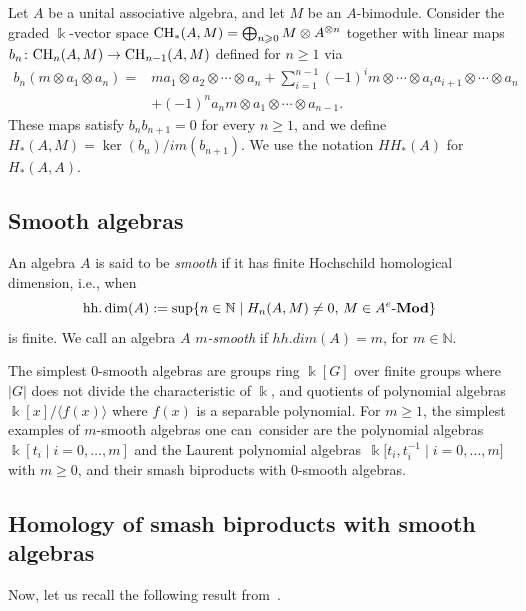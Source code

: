 \documentclass[10pt,a4paper]{amsart}
\newcommand{\B}[1]{\mathbb{#1}}
\newcommand{\lmod}[1]{{#1}\text{-{\bf Mod}}}
\newcommand{\CH}{{\rm CH}}
\renewcommand{\geq}{\geqslant}
\numberwithin{equation}{section}
\begin{document}
Let $A$ be a unital associative algebra, and let $M$ be an $A$-bimodule. Consider the
graded $\Bbbk$-vector space
$\CH_*(A,M) = \bigoplus_{n\geq 0} M\otimes A^{\otimes n} $ together with linear maps
$b_n\colon \CH_n(A,M)\to\CH_{n-1}(A,M)$ defined for $n\geq 1$ via
\begin{align*}
 b_n(m\otimes a_1\otimes a_n)
 = {}& m a_1\otimes a_2\otimes\cdots\otimes a_n + \sum_{i=1}^{n-1}(-1)^i m\otimes\cdots\otimes a_ia_{i+1}\otimes\cdots\otimes a_n \\
 & + (-1)^n a_n m \otimes a_1\otimes\cdots\otimes a_{n-1}.
\end{align*}
These maps satisfy $b_nb_{n+1} = 0$ for every $n\geq 1$, and we define
$H_*(A,M) = \ker(b_n)/im(b_{n+1})$. We use the notation $HH_*(A)$ for $H_*(A,A)$.

\subsection{Smooth algebras}\label{sect:smooth}

An algebra $A$ is said to be \emph{smooth} if it has finite Hochschild homological
dimension, i.e., when
\[ \operatorname{ hh.dim}(A) := \sup\{n\in\B{N}\mid H_n(A,M)\neq 0,\,M\in\lmod{A^e}\} \] is finite. We call
an algebra $A$ \emph{$m$-smooth} if $hh.dim(A)=m$, for $m\in\B{N}$.

The simplest $0$-smooth algebras are groups ring $\Bbbk[G]$ over finite groups where $|G|$
does not divide the characteristic of $\Bbbk$, and quotients of polynomial algebras
$\Bbbk[x]/\langle f(x)\rangle$ where $f(x)$ is a separable polynomial. For $m\geq 1$, the
simplest examples of $m$-smooth algebras one can~consider are the polynomial algebras
$\Bbbk[t_i\mid i=0,\ldots,m]$ and the Laurent polynomial algebras~${\Bbbk\big[t_i,t_i^{-1}\mid i=0,\ldots,m\big]}$ with $m\geq 0$, and their smash biproducts with
$0$-smooth algebras.

\subsection{Homology of smash biproducts with smooth algebras}
Now, let us recall the following result
from~\cite[Proposition~1.5]{KaygunSutlu:HomologyOfQuantumLinearGroups}.
\end{document}
